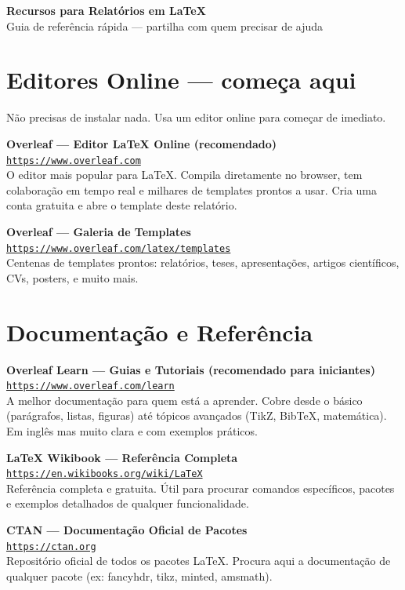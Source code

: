 \documentclass[12pt]{article}
\newcommand{\recurso}[3]{%
    \begin{mdframed}[style=resourcebox]
        \textbf{#1}\\[3pt]
        \href{#2}{\textcolor{linkblue}{\small\texttt{#2}}}\\[5pt]
        \small #3
    \end{mdframed}
}
\begin{document}
\thispagestyle{empty}

\begin{mdframed}[style=headerbox]
    \color{white}
    {\LARGE \textbf{Recursos para Relatórios em \LaTeX}}\\[4pt]
    {\normalsize Guia de referência rápida — partilha com quem precisar de ajuda}
\end{mdframed}


\section{Editores Online — começa aqui}

Não precisas de instalar nada. Usa um editor online para começar de imediato.

\recurso{Overleaf — Editor LaTeX Online (recomendado)}
    {https://www.overleaf.com}
    {O editor mais popular para LaTeX. Compila diretamente no browser,
     tem colaboração em tempo real e milhares de templates prontos a usar.
     Cria uma conta gratuita e abre o template deste relatório.}

\recurso{Overleaf — Galeria de Templates}
    {https://www.overleaf.com/latex/templates}
    {Centenas de templates prontos: relatórios, teses, apresentações,
     artigos científicos, CVs, posters, e muito mais.}


\section{Documentação e Referência}

\recurso{Overleaf Learn — Guias e Tutoriais (recomendado para iniciantes)}
    {https://www.overleaf.com/learn}
    {A melhor documentação para quem está a aprender. Cobre desde o básico
     (parágrafos, listas, figuras) até tópicos avançados (TikZ, BibTeX,
     matemática). Em inglês mas muito clara e com exemplos práticos.}

\recurso{LaTeX Wikibook — Referência Completa}
    {https://en.wikibooks.org/wiki/LaTeX}
    {Referência completa e gratuita. Útil para procurar comandos
     específicos, pacotes e exemplos detalhados de qualquer funcionalidade.}

\recurso{CTAN — Documentação Oficial de Pacotes}
    {https://ctan.org}
    {Repositório oficial de todos os pacotes LaTeX. Procura aqui a
     documentação de qualquer pacote (ex: fancyhdr, tikz, minted, amsmath).}
\end{document}
